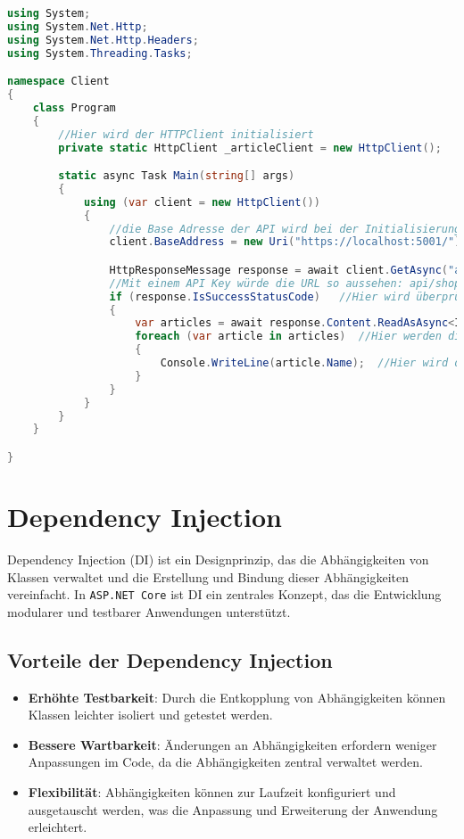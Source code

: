 \documentclass[a4paper,12pt]{report}
\begin{document}
\begin{lstlisting}[language=csharp, caption=Beispiel für einen API-Controller in C\#]
using System;
using System.Net.Http;
using System.Net.Http.Headers;
using System.Threading.Tasks;

namespace Client
{
    class Program 
    {
        //Hier wird der HTTPClient initialisiert
        private static HttpClient _articleClient = new HttpClient();

        static async Task Main(string[] args)
        {
            using (var client = new HttpClient())
            {
                //die Base Adresse der API wird bei der Initialisierung des HTTPClient angegeben und wird bei jeder Anfrage verwendet
                client.BaseAddress = new Uri("https://localhost:5001/");

                HttpResponseMessage response = await client.GetAsync("api/shop/articles");
                //Mit einem API Key würde die URL so aussehen: api/shop/articles?apiKey=1234
                if (response.IsSuccessStatusCode)   //Hier wird überprüft ob die Anfrage erfolgreich war
                {
                    var articles = await response.Content.ReadAsAsync<IEnumerable<Article>>();  //Hier werden die Daten in eine Liste von Artikeln umgewandelt
                    foreach (var article in articles)  //Hier werden die Daten durchgegangen
                    {
                        Console.WriteLine(article.Name);  //Hier wird der Name des Artikels ausgegeben
                    }
                }
            }
        }
    }

}
\end{lstlisting}


\section{Dependency Injection}
Dependency Injection (DI) ist ein Designprinzip, das die Abhängigkeiten von Klassen verwaltet und die Erstellung und Bindung dieser Abhängigkeiten vereinfacht. In \texttt{ASP.NET Core} ist DI ein zentrales Konzept, das die Entwicklung modularer und testbarer Anwendungen unterstützt.

\subsection{Vorteile der Dependency Injection}
\begin{itemize}
    \item \textbf{Erhöhte Testbarkeit}: Durch die Entkopplung von Abhängigkeiten können Klassen leichter isoliert und getestet werden.
    \item \textbf{Bessere Wartbarkeit}: Änderungen an Abhängigkeiten erfordern weniger Anpassungen im Code, da die Abhängigkeiten zentral verwaltet werden.
    \item \textbf{Flexibilität}: Abhängigkeiten können zur Laufzeit konfiguriert und ausgetauscht werden, was die Anpassung und Erweiterung der Anwendung erleichtert.
\end{itemize}
\end{document}
